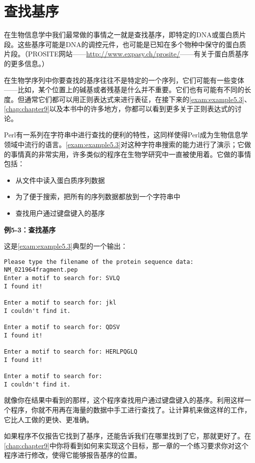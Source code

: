\section{查找基序}
在生物信息学中我们最常做的事情之一就是查找基序，即特定的DNA或蛋白质片段。这些基序可能是DNA的调控元件，也可能是已知在多个物种中保守的蛋白质片段。（PROSITE网站——\href{http://www.expasy.ch/prosite/}{http://www.expasy.ch/prosite/}——有关于蛋白质基序的更多信息。）

在生物学序列中你要查找的基序往往不是特定的一个序列，它们可能有一些变体——比如，某个位置上的碱基或者残基是什么并不重要。它们也有可能有不同的长度。但通常它们都可以用正则表达式来进行表征，在接下来的\autoref{exam:example5.3}、\autoref{chap:chapter9}以及本书中的许多地方，你都可以看到更多关于正则表达式的讨论。

Perl有一系列在字符串中进行查找的便利的特性，这同样使得Perl成为生物信息学领域中流行的语言。\autoref{exam:example5.3}对这种字符串搜索的能力进行了演示；它做的事情真的非常实用，许多类似的程序在生物学研究中一直被使用着。它做的事情包括：

\begin{itemize}
  \item 从文件中读入蛋白质序列数据
  \item 为了便于搜索，把所有的序列数据都放到一个字符串中
  \item 查找用户通过键盘键入的基序
\end{itemize}

\textbf{例5-3：查找基序}


这是\autoref{exam:example5.3}典型的一个输出：

\begin{lstlisting}
Please type the filename of the protein sequence data:
NM_021964fragment.pep
Enter a motif to search for: SVLQ
I found it!

Enter a motif to search for: jkl
I couldn't find it.

Enter a motif to search for: QDSV
I found it!

Enter a motif to search for: HERLPQGLQ
I found it!

Enter a motif to search for: 
I couldn't find it. 
\end{lstlisting}

就像你在结果中看到的那样，这个程序查找用户通过键盘键入的基序。利用这样一个程序，你就不用再在海量的数据中手工进行查找了。让计算机来做这样的工作，它比人工做的更快、更准确。

如果程序不仅报告它找到了基序，还能告诉我们在哪里找到了它，那就更好了。在\autoref{chap:chapter9}中你将看到如何来实现这个目标，那一章的一个练习要求你对这个程序进行修改，使得它能够报告基序的位置。


